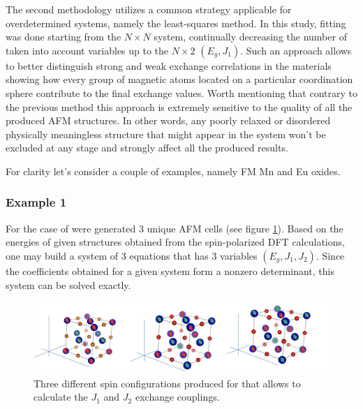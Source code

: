 The second methodology utilizes a common strategy applicable for overdetermined systems, namely the least-squares method. In this study, fitting was done starting from the $N \times N$ system, continually decreasing the number of taken into account variables up to the $N \times 2$ $(E_g, J_1)$. Such an approach allows to better distinguish strong and weak exchange correlations in the materials showing how every group of magnetic atoms located on a particular coordination sphere contribute to the final exchange values. Worth mentioning that contrary to the previous method this approach is extremely sensitive to the quality of all the produced AFM structures. In other words,  any poorly relaxed or disordered physically meaningless structure that might appear in the system won't be excluded at any stage and strongly affect all the produced results.

For clarity let's consider a couple of examples, namely FM Mn and Eu oxides.

\subsubsection{Example 1}

For the case of  were generated 3 unique AFM cells (see figure \ref{fig:example_1}). Based on the energies of given structures obtained from the spin-polarized DFT calculations, one may build a system of 3 equations that has 3 variables $(E_g, J_1, J_2)$. Since the coefficients obtained for a given system form a nonzero determinant, this system can be solved exactly.

\begin{figure}[H]
\centering
\captionsetup{justification=centering,margin=2cm}
\includegraphics[width=160mm]{fig/dft_fig/example_1.png}
\caption[Three different spin configurations produced for .]{Three different spin configurations produced for  that allows to calculate the $J_1$ and $J_2$ exchange couplings.}
\label{fig:example_1}
\end{figure}

